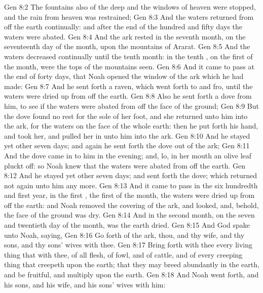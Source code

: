 \vs Gen 8:2 The fountains also of the deep and the windows of heaven were stopped, and the rain from heaven was restrained;
\vs Gen 8:3 And the waters returned from off the earth continually: and after the end of the hundred and fifty days the waters were abated.
\vs Gen 8:4 And the ark rested in the seventh month, on the seventeenth day of the month, upon the mountains of Ararat.
\vs Gen 8:5 And the waters decreased continually until the tenth month: in the tenth , on the first  of the month, were the tops of the mountains seen.
\vs Gen 8:6 And it came to pass at the end of forty days, that Noah opened the window of the ark which he had made:
\vs Gen 8:7 And he sent forth a raven, which went forth to and fro, until the waters were dried up from off the earth.
\vs Gen 8:8 Also he sent forth a dove from him, to see if the waters were abated from off the face of the ground;
\vs Gen 8:9 But the dove found no rest for the sole of her foot, and she returned unto him into the ark, for the waters  on the face of the whole earth: then he put forth his hand, and took her, and pulled her in unto him into the ark.
\vs Gen 8:10 And he stayed yet other seven days; and again he sent forth the dove out of the ark;
\vs Gen 8:11 And the dove came in to him in the evening; and, lo, in her mouth  an olive leaf pluckt off: so Noah knew that the waters were abated from off the earth.
\vs Gen 8:12 And he stayed yet other seven days; and sent forth the dove; which returned not again unto him any more.
\vs Gen 8:13 And it came to pass in the six hundredth and first year, in the first , the first  of the month, the waters were dried up from off the earth: and Noah removed the covering of the ark, and looked, and, behold, the face of the ground was dry.
\vs Gen 8:14 And in the second month, on the seven and twentieth day of the month, was the earth dried.
\vs Gen 8:15 And God spake unto Noah, saying,
\vs Gen 8:16 Go forth of the ark, thou, and thy wife, and thy sons, and thy sons' wives with thee.
\vs Gen 8:17 Bring forth with thee every living thing that  with thee, of all flesh,  of fowl, and of cattle, and of every creeping thing that creepeth upon the earth; that they may breed abundantly in the earth, and be fruitful, and multiply upon the earth.
\vs Gen 8:18 And Noah went forth, and his sons, and his wife, and his sons' wives with him:
